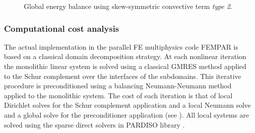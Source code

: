 \begin{figure}[h!]
	\centering	
	\caption{Global energy balance using skew-symmetric convective term \textit{type 2}.}
	\label{fig:ene_balance_sk2}
\end{figure}

\subsubsection{Computational cost analysis}

\label{subsubsec-C4_comp_cost_DHIT}
The actual implementation in the parallel FE multiphysics code FEMPAR \cite{Badia2013a} is based on a classical domain decomposition strategy. At each nonlinear iteration the monolithic linear system is solved using a classical GMRES method applied to the Schur complement over the interfaces of the subdomains. This iterative procedure is preconditioned using a balancing Neumann-Neumann method applied to the monolithic system. The cost of each iteration is that of local Dirichlet solves for the Schur complement application and a local Neumann solve and a global solve for the preconditioner application (see \cite{mandel_balancing_1993,dohrmann_preconditioner_2003,badia_implementation_2013}). All local systems are solved using the sparse direct solvers in PARDISO library \cite{Schenk2004,Schenk2006}.

